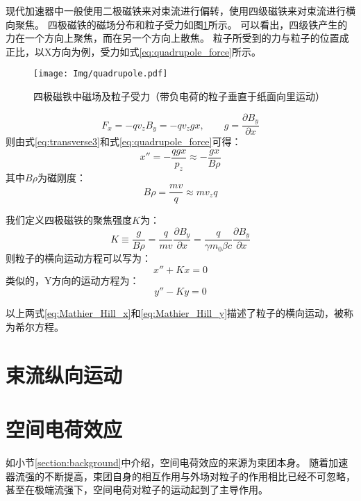 现代加速器中一般使用二极磁铁来对束流进行偏转，使用四级磁铁来对束流进行横向聚焦。
四极磁铁的磁场分布和粒子受力如图\ref{fig:quadrupole}所示\cite{qinq2011ring}。
可以看出，四级铁产生的力在一个方向上聚焦，而在另一个方向上散焦。
粒子所受到的力与粒子的位置成正比，以X方向为例，受力如式\ref{eq:quadrupole_force}所示。
\begin{figure}[!htb]
    \centering
    \texttt{[image: Img/quadrupole.pdf]}
    \caption{四极磁铁中磁场及粒子受力（带负电荷的粒子垂直于纸面向里运动）}
    \label{fig:quadrupole}
\end{figure}
\begin{equation}
    \label{eq:quadrupole_force}
    F_x = -q {v}_{z} {B}_{y} = -q {v}_{z} g x, \qquad g=\frac{\partial B_y}{\partial x}
\end{equation}
则由式\ref{eq:transverse3}和式\ref{eq:quadrupole_force}可得：
\begin{equation}
    \label{eq:quadrupole_force2}
    x'' = -\frac{qgx}{p_z} \approx -\frac{gx}{B\rho}
\end{equation}
其中${B\rho}$为磁刚度：
\begin{equation}
    {B\rho}=\frac{mv}{q}\approx{mv_z}{q}
\end{equation}

我们定义四极磁铁的聚焦强度$K$为：
\begin{equation}
    \label{eq:quadrupole_force3}
    K \equiv \frac{g}{B\rho} = \frac{q}{mv}                 \frac{\partial B_y}{\partial x} 
                             = \frac{q}{\gamma m_0 \beta c} \frac{\partial B_y}{\partial x} 
\end{equation}
则粒子的横向运动方程可以写为：
\begin{equation}
    \label{eq:Mathier_Hill_x}
    x'' + Kx =0
\end{equation}
类似的，Y方向的运动方程为：
\begin{equation}
    \label{eq:Mathier_Hill_y}
    y'' - Ky =0
\end{equation}

以上两式\ref{eq:Mathier_Hill_x}和\ref{eq:Mathier_Hill_y}描述了粒子的横向运动，被称为希尔方程。

\section{束流纵向运动}

\section{空间电荷效应}
如小节\ref{section:background}中介绍，空间电荷效应的来源为束团本身。
随着加速器流强的不断提高，束团自身的相互作用与外场对粒子的作用相比已经不可忽略，
甚至在极端流强下，空间电荷对粒子的运动起到了主导作用。

